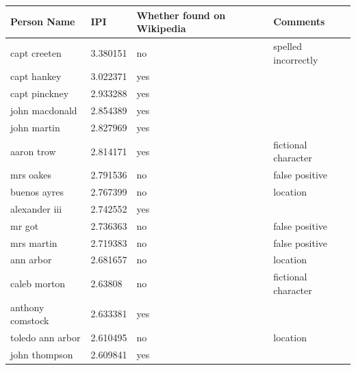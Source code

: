 \documentclass[letterpaper,11pt]{report}
\begin{document}
\begin{table}[h]
\centering
\begin{tabular}{|l|l|p{3cm}|p{3cm}|}

\hline

\textbf{Person Name}      & \textbf{IPI}      & \textbf{Whether found on Wikipedia} & \textbf{Comments}                                     \\ \hline
capt creeten     & 3.380151 & no                 & spelled incorrectly \\ \hline
capt hankey      & 3.022371 & yes                &                                      \\ \hline
capt pinckney    & 2.933288 & yes                &                                      \\ \hline
john macdonald   & 2.854389 & yes                &                                      \\ \hline
john martin      & 2.827969 & yes                &                                      \\ \hline
aaron trow       & 2.814171 & yes                & fictional character                  \\ \hline
mrs oakes        & 2.791536 & no                 & false positive                       \\ \hline
buenos ayres     & 2.767399 & no                 & location                             \\ \hline
alexander iii    & 2.742552 & yes                &                                      \\ \hline
mr got           & 2.736363 & no                 & false positive                       \\ \hline
mrs martin       & 2.719383 & no                 & false positive                       \\ \hline
ann arbor        & 2.681657 & no                 & location                             \\ \hline
caleb morton     & 2.63808  & no                 & fictional character                  \\ \hline
anthony comstock & 2.633381 & yes                &                                      \\ \hline
toledo ann arbor & 2.610495 & no                 & location                             \\ \hline
john thompson    & 2.609841 & yes                &                                      \\ \hline

\end{tabular}
\end{table}
\end{document}
